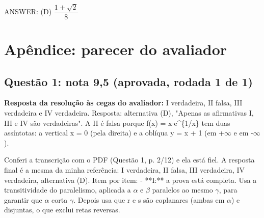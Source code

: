 \documentclass{article}%
\begin{document}
ANSWER: (D) $\dfrac{1+\sqrt2}{8}$%
\newpage%
\section*{Apêndice: parecer do avaliador}%
\subsection*{Questão 1: nota 9,5 (aprovada, rodada 1 de 1)}%
\textbf{Resposta da resolução às cegas do avaliador:} I verdadeira, II falsa, III verdadeira e IV verdadeira. Resposta: alternativa (D), "Apenas as afirmativas I, III e IV são verdadeiras". A II é falsa porque f(x) = x$\cdot$e\^{}\{1/x\} tem duas assíntotas: a vertical x = 0 (pela direita) e a oblíqua y = x + 1 (em +$\infty$ e em -$\infty$).\par %
Conferi a transcrição com o PDF (Questão 1, p. 2/12) e ela está fiel. A resposta final é a mesma da minha referência: I verdadeira, II falsa, III verdadeira, IV verdadeira, alternativa (D).\newline%
\newline%
Item por item:\newline%
{-} **I:** a prova está completa. Usa a transitividade do paralelismo, aplicada a $\alpha$ e $\beta$ paralelos ao mesmo $\gamma$, para garantir que $\alpha$ corta $\gamma$. Depois usa que r e s são coplanares (ambas em $\alpha$) e disjuntas, o que exclui retas reversas.\newline%
\end{document}
